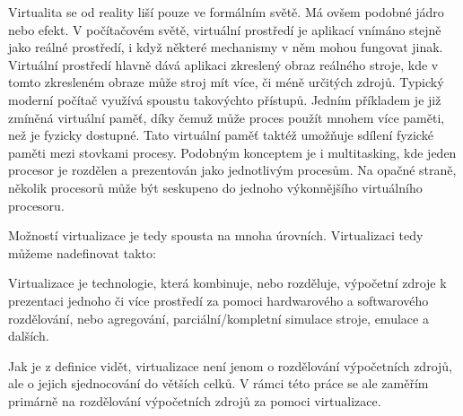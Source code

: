 Virtualita se od reality liší pouze ve formálním světě. Má ovšem podobné jádro nebo efekt. V počítačovém světě, virtuální prostředí je aplikací vnímáno stejně jako reálné prostředí, i když některé mechanismy v něm mohou fungovat jinak. Virtuální prostředí hlavně dává aplikaci zkreslený obraz reálného stroje, kde v tomto zkresleném obraze může stroj mít více, či méně určitých zdrojů. Typický moderní počítač využívá spoustu takovýchto přístupů. Jedním příkladem je již zmíněná virtuální paměť, díky čemuž může proces použít mnohem více paměti, než je fyzicky dostupné. Tato virtuální paměť taktéž umožňuje sdílení fyzické paměti mezi stovkami procesy. Podobným konceptem je i multitasking, kde jeden procesor je rozdělen a prezentován jako  jednotlivým procesům. Na opačné straně, několik procesorů může být seskupeno do jednoho výkonnějšího virtuálního procesoru.

Možností virtualizace je tedy spousta na mnoha úrovních. Virtualizaci tedy můžeme nadefinovat takto:

\begin{displayquote}
    Virtualizace je technologie, která kombinuje, nebo rozděluje, výpočetní zdroje k prezentaci jednoho či více prostředí za pomoci hardwarového a softwarového rozdělování, nebo agregování, parciální/kompletní simulace stroje, emulace a dalších.
\end{displayquote}

Jak je z definice vidět, virtualizace není jenom o rozdělování výpočetních zdrojů, ale o jejich sjednocování do větších celků. V rámci této práce se ale zaměřím primárně na rozdělování výpočetních zdrojů za pomoci virtualizace. \cite{campbell2006introduction}\cite{chiueh2005survey}